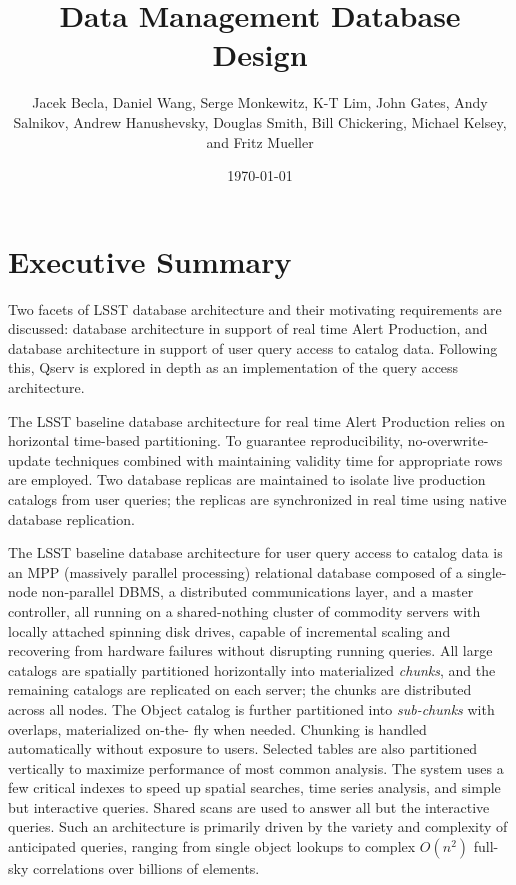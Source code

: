 \documentclass[DM,lsstdraft,toc]{lsstdoc}
\title{Data Management Database Design}
\author{%
	Jacek Becla,
	Daniel Wang,
	Serge Monkewitz,
	K-T Lim,
	John Gates,
	Andy Salnikov,
	Andrew Hanushevsky,
	Douglas Smith,
	Bill Chickering,
	Michael Kelsey,
	and
	Fritz Mueller
}
\date{\today}
\begin{document}
\maketitle

\section{Executive Summary}\label{executive-summary}

Two facets of LSST database architecture and their motivating requirements
are discussed: database architecture in support of real time Alert Production,
and database architecture in support of user query access to catalog data.
Following this, Qserv is explored in depth as an implementation of the query
access architecture.

The LSST baseline database architecture for real time Alert
Production relies on horizontal time-based partitioning. To guarantee
reproducibility, no-overwrite-update techniques combined with
maintaining validity time for appropriate rows are employed. Two
database replicas are maintained to isolate live production catalogs
from user queries; the replicas are synchronized in real time using
native database replication.

The LSST baseline database architecture for user query access to catalog data
is an MPP (massively parallel processing) relational database composed of a
single-node non-parallel DBMS, a distributed communications layer, and a
master controller, all running on a shared-nothing cluster of commodity
servers with locally attached spinning disk drives, capable of incremental
scaling and recovering from hardware failures without disrupting running
queries. All large catalogs are spatially partitioned horizontally into
materialized \emph{chunks}, and the remaining catalogs are replicated on each
server; the chunks are distributed across all nodes. The Object catalog is
further partitioned into \emph{sub-chunks} with overlaps, materialized on-the-
fly when needed. Chunking is handled automatically without exposure to users.
Selected tables are also partitioned vertically to maximize performance of
most common analysis. The system uses a few critical indexes to speed up
spatial searches, time series analysis, and simple but interactive queries.
Shared scans are used to answer all but the interactive queries. Such an
architecture is primarily driven by the variety and complexity of anticipated
queries, ranging from single object lookups to complex \(O(n^2)\) full-sky
correlations over billions of elements.
\end{document}
